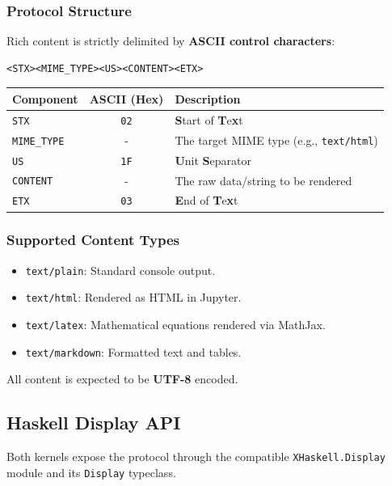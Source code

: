 \documentclass[11pt]{scrartcl}
\begin{document}
\subsubsection{Protocol Structure}


Rich content is strictly delimited by \textbf{ASCII control characters}:
\begin{verbatim}
<STX><MIME_TYPE><US><CONTENT><ETX>
\end{verbatim}


\begin{center}
\begin{tabular}{|l|c|p{8cm}|}
\hline
\textbf{Component} & \textbf{ASCII (Hex)} & \textbf{Description} \\
\hline
\texttt{STX} & \texttt{02} & \textbf{S}tart of \textbf{T}e\textbf{x}t \\
\hline
\texttt{MIME\_TYPE} & - & The target MIME type (e.g., \texttt{text/html}) \\
\hline
\texttt{US} & \texttt{1F} & \textbf{U}nit \textbf{S}eparator \\
\hline
\texttt{CONTENT} & - & The raw data/string to be rendered \\
\hline
\texttt{ETX} & \texttt{03} & \textbf{E}nd of \textbf{T}e\textbf{x}t \\
\hline
\end{tabular}
\end{center}
\subsubsection{Supported Content Types}


\begin{itemize}
\item \texttt{text/plain}: Standard console output.
\item \texttt{text/html}: Rendered as HTML in Jupyter.
\item \texttt{text/latex}: Mathematical equations rendered via MathJax.
\item \texttt{text/markdown}: Formatted text and tables.
\end{itemize}


All content is expected to be \textbf{UTF-8} encoded.
\subsection{Haskell Display API}


Both kernels expose the protocol through the compatible \texttt{XHaskell.Display} module and its \texttt{Display} typeclass.
\end{document}
